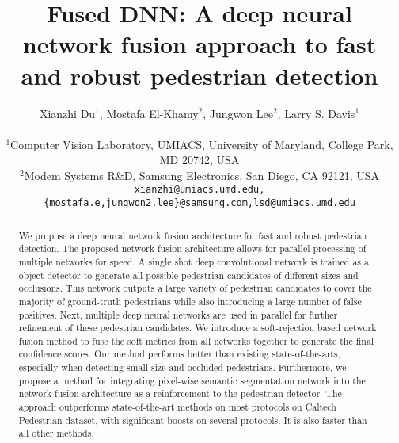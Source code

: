 \documentclass[10pt,letterpaper]{article}
\begin{document}
\title{Fused DNN: A deep neural network fusion approach to fast and robust pedestrian detection}

\author{Xianzhi Du$^1$, Mostafa El-Khamy$^2$, Jungwon Lee$^2$, Larry S. Davis$^1$\\
\\
$^1$Computer Vision Laboratory, UMIACS, University of Maryland, College Park, MD 20742, USA\\
$^2$Modem Systems R$\&$D, Samsung Electronics, San Diego, CA 92121, USA\\
{\tt\small xianzhi@umiacs.umd.edu,\tt\small \{mostafa.e,jungwon2.lee\}@samsung.com,\tt\small lsd@umiacs.umd.edu}
}
\maketitle

\begin{abstract}
We propose a deep neural network fusion architecture for fast and robust pedestrian detection. The proposed network fusion architecture allows for parallel processing of multiple networks for speed. A single shot deep convolutional network is trained as a object detector to generate all possible pedestrian candidates of different sizes and occlusions. This network outputs a large variety of pedestrian candidates to cover the majority of ground-truth pedestrians while also introducing a large number of false positives. Next, multiple deep neural networks are used in parallel for further refinement of these pedestrian candidates. We introduce a soft-rejection based network fusion method to fuse the soft metrics from all networks together to generate the final confidence scores. Our method performs better than existing state-of-the-arts, especially when detecting small-size and occluded pedestrians. Furthermore, we propose a method for integrating pixel-wise semantic segmentation network into the network fusion architecture as a reinforcement to the pedestrian detector. The approach outperforms state-of-the-art methods on most protocols on Caltech Pedestrian dataset, with significant boosts on several protocols. It is also faster than all other methods.
\end{abstract}
\end{document}
